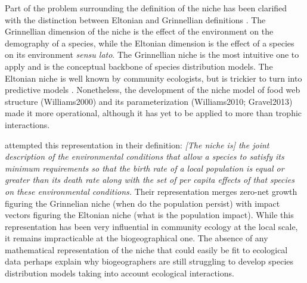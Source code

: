 \documentclass[12pt]{article}
\begin{document}
Part of the problem surrounding the definition of the niche has been
clarified with the distinction between Eltonian and Grinnellian definitions
\parencite{Chase2003}. The Grinnellian dimension of the niche is the
effect of the environment on the demography of a species, while the Eltonian
dimension is the effect of a species on its environment \emph{sensu lato}. The
Grinnellian niche is the most intuitive one to apply and is the conceptual
backbone of species distribution models. The Eltonian niche is well known
by community ecologists, but is trickier to turn into predictive models
\parencite{Devictor2010a}. Nonetheless, the development of the niche model
of food web structure (Williams2000) and its parameterization (Williams2010;
Gravel2013) made it more operational, although it has yet to be applied to
more than trophic interactions.

\textcite{Chase2003} attempted this representation in their definition:
\textit{[The niche is] the joint description of the environmental conditions
that allow a species to satisfy its minimum requirements so that the birth rate
of a local population is equal or greater than its death rate along with the
set of per capita effects of that species on these environmental conditions.}
Their representation merges zero-net growth figuring the Grinnelian niche
(when do the population persist) with impact vectors figuring the Eltonian
niche (what is the population impact). While this representation has been very
influential in community ecology at the local scale, it remains impracticable
at the biogeographical one. The absence of any mathematical representation
of the niche that could easily be fit to ecological data perhaps explain why
biogeographers are still struggling to develop species distribution models
taking into account ecological interactions.
\end{document}
